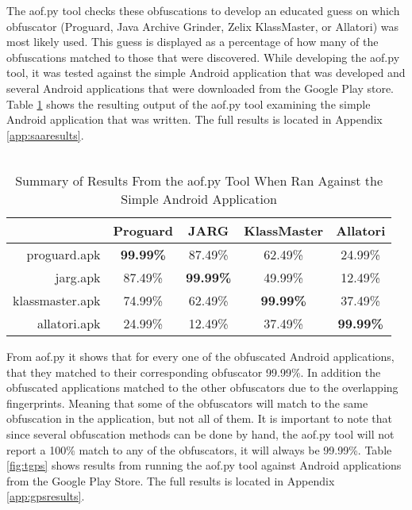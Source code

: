 The aof.py tool checks these obfuscations to develop an educated guess on which obfuscator (Proguard, Java Archive Grinder, Zelix KlassMaster, or Allatori) was most likely used. This guess is displayed as a percentage of how many of the obfuscations matched to those that were discovered. While developing the aof.py tool, it was tested against the simple Android application that was developed and several Android applications that were downloaded from the Google Play store. Table \ref{fig:tsaa} shows the resulting output of the aof.py tool examining the simple Android application that was written. The full results is located in Appendix \ref{app:saaresults}.\\\\
\begin{table}[H]
\centering
\begin{tabular}{| r | c | c | c | c |}
\hline
 & Proguard & JARG & KlassMaster & Allatori \\
\hline
proguard.apk & \textbf{99.99\%} & 87.49\% & 62.49\% & 24.99\% \\
\hline
jarg.apk & 87.49\% & \textbf{99.99\%} & 49.99\% & 12.49\% \\
\hline
klassmaster.apk & 74.99\% & 62.49\% & \textbf{99.99\%} & 37.49\% \\
\hline
allatori.apk & 24.99\% & 12.49\% & 37.49\% & \textbf{99.99\%} \\
\hline
\end{tabular}
\caption{Summary of Results From the aof.py Tool When Ran Against the Simple Android Application \label{fig:tsaa}}
\end{table}
From aof.py it shows that for every one of the obfuscated Android applications, that they matched to their corresponding obfuscator 99.99\%. In addition the obfuscated applications matched to the other obfuscators due to the overlapping fingerprints. Meaning that some of the obfuscators will match to the same obfuscation in the application, but not all of them. It is important to note that since several obfuscation methods can be done by hand, the aof.py tool will not report a 100\% match to any of the obfuscators, it will always be 99.99\%. Table \ref{fig:tgps} shows results from running the aof.py tool against Android applications from the Google Play Store. The full results is located in Appendix \ref{app:gpsresults}.\\\\
